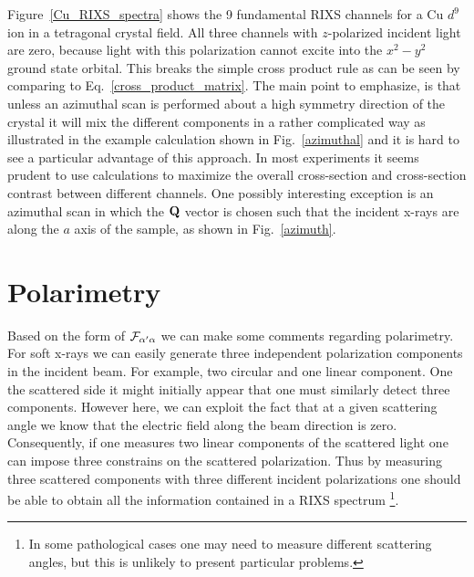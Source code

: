 \documentclass[aps,onecolumn, notitlepage, longbibliography]{revtex4-1}
\begin{document}
Figure~\ref{Cu_RIXS_spectra} shows the 9 fundamental RIXS channels for a Cu $d^9$ ion in a tetragonal crystal field. All three channels with $z$-polarized incident light are zero, because light with this polarization cannot excite into the $x^2-y^2$ ground state orbital. This breaks the simple cross product rule as can be seen by comparing to Eq.~\ref{cross_product_matrix}. The main point to emphasize, is that unless an azimuthal scan is performed about a high symmetry direction of the crystal it will mix the different components in a rather complicated way as illustrated in the example calculation shown in Fig.~\ref{azimuthal} and it is hard to see a particular advantage of this approach. In most experiments it seems prudent to use calculations to maximize the overall cross-section and cross-section contrast between different channels. One possibly interesting exception is an azimuthal scan in which the ${\bf Q}$ vector is chosen such that the incident x-rays are along the $a$ axis of the sample, as shown in Fig.~\ref{azimuth}.


\section{Polarimetry}
Based on the form of ${\cal F}_{\alpha^\prime\alpha}$ we can make some comments regarding polarimetry. For soft x-rays we can easily generate three independent polarization components in the incident beam. For example, two circular and one linear component. One the scattered side it might initially appear that one must similarly detect three components. However here, we can exploit the fact that at a given scattering angle we know that the electric field along the beam direction is zero. Consequently, if one measures two linear components of the scattered light one can impose three constrains on the scattered polarization. Thus by measuring three scattered components with three different incident polarizations one should be able to obtain all the information contained in a RIXS spectrum \footnote{In some pathological cases one may need to measure different scattering angles, but this is unlikely to present particular problems.}. 
\end{document}
